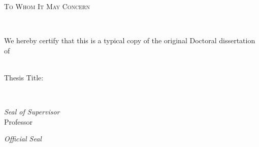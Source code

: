 \begin{center}
	
{\LARGE \scshape To Whom It May Concern  \par}\vspace{0.4cm} %
\HRule \\[1.5cm] %
	{\Large We hereby certify that this is a typical copy of the original Doctoral dissertation of \par}
	\vspace{1cm}
	 {\large \authorname} \\ \vspace{1cm}
	Thesis Title:\\ \vspace{0.5cm}
	 {\Large \ttitle}
	\vspace{3cm}
	
	\HRule \\[0.5cm]
\begin{minipage}[t]{0.4\textwidth}
	\begin{flushleft} \large
		\emph{Seal of Supervisor}  \\ 
		\vspace{3cm}
		{Professor \supname} %
	\end{flushleft}
\end{minipage}
\begin{minipage}[t]{0.5\textwidth}
	\begin{flushright} \large
		\emph{Official Seal} \\
			\vspace{3cm}
			\deptname
	\end{flushright}
\end{minipage}
\\[0.5cm]
\HRule \\[0.5cm]
\vfill
	
\end{center}